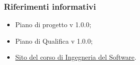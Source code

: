 \subsubsection{Riferimenti informativi}
\begin{itemize}
	\item Piano di progetto v 1.0.0;
	\item Piano di Qualifica v 1.0.0;
	\item \href{https://www.math.unipd.it/~tullio/IS-1/2018/}{Sito del corso di Ingegneria del Software}.
\end{itemize}

